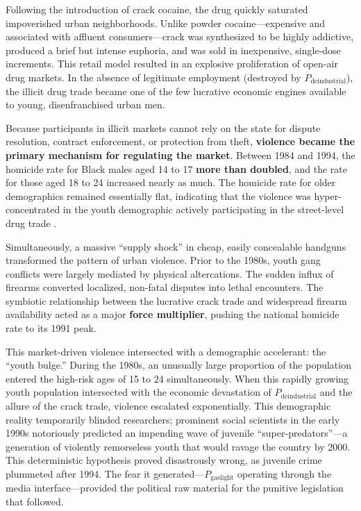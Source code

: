 Following the introduction of crack cocaine, the drug quickly saturated impoverished urban neighborhoods. Unlike powder cocaine---expensive and associated with affluent consumers---crack was synthesized to be highly addictive, produced a brief but intense euphoria, and was sold in inexpensive, single-dose increments. This retail model resulted in an explosive proliferation of open-air drug markets. In the absence of legitimate employment (destroyed by $P_{\text{deindustrial}}$), the illicit drug trade became one of the few lucrative economic engines available to young, disenfranchised urban men.

Because participants in illicit markets cannot rely on the state for dispute resolution, contract enforcement, or protection from theft, \textbf{violence became the primary mechanism for regulating the market}. Between 1984 and 1994, the homicide rate for Black males aged 14 to 17 \textbf{more than doubled}, and the rate for those aged 18 to 24 increased nearly as much. The homicide rate for older demographics remained essentially flat, indicating that the violence was hyper-concentrated in the youth demographic actively participating in the street-level drug trade \cite{bjs_homicide_trends}.

Simultaneously, a massive ``supply shock'' in cheap, easily concealable handguns transformed the pattern of urban violence. Prior to the 1980s, youth gang conflicts were largely mediated by physical altercations. The sudden influx of firearms converted localized, non-fatal disputes into lethal encounters. The symbiotic relationship between the lucrative crack trade and widespread firearm availability acted as a major \textbf{force multiplier}, pushing the national homicide rate to its 1991 peak.

This market-driven violence intersected with a demographic accelerant: the ``youth bulge.'' During the 1980s, an unusually large proportion of the population entered the high-risk ages of 15 to 24 simultaneously. When this rapidly growing youth population intersected with the economic devastation of $P_{\text{deindustrial}}$ and the allure of the crack trade, violence escalated exponentially. This demographic reality temporarily blinded researchers; prominent social scientists in the early 1990s notoriously predicted an impending wave of juvenile ``super-predators''---a generation of violently remorseless youth that would ravage the country by 2000. This deterministic hypothesis proved disastrously wrong, as juvenile crime plummeted after 1994. The fear it generated---$P_{\text{gaslight}}$ operating through the media interface---provided the political raw material for the punitive legislation that followed.

